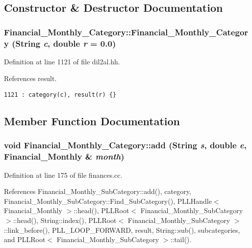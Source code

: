 \subsection{Constructor \& Destructor Documentation}
\subsubsection{\setlength{\rightskip}{0pt plus 5cm}Financial\_\-Monthly\_\-Category::Financial\_\-Monthly\_\-Category ({\bf String} {\em c}, double {\em r} = 0.0)\hspace{0.3cm}{\tt  [inline]}}\label{classFinancial__Monthly__Category_a0}




Definition at line 1121 of file dil2al.hh.

References result.



\footnotesize\begin{verbatim}1121 : category(c), result(r) {}
\end{verbatim}\normalsize 


\subsection{Member Function Documentation}
\subsubsection{\setlength{\rightskip}{0pt plus 5cm}void Financial\_\-Monthly\_\-Category::add ({\bf String} {\em s}, double {\em e}, {\bf Financial\_\-Monthly} \& {\em month})}\label{classFinancial__Monthly__Category_a5}




Definition at line 175 of file finances.cc.

References Financial\_\-Monthly\_\-Sub\-Category::add(), category, Financial\_\-Monthly\_\-Sub\-Category::Find\_\-Sub\-Category(), PLLHandle$<$ Financial\_\-Monthly $>$::head(), PLLRoot$<$ Financial\_\-Monthly\_\-Sub\-Category $>$::head(), String::index(), PLLRoot$<$ Financial\_\-Monthly\_\-Sub\-Category $>$::link\_\-before(), PLL\_\-LOOP\_\-FORWARD, result, String::sub(), subcategories, and PLLRoot$<$ Financial\_\-Monthly\_\-Sub\-Category $>$::tail().

